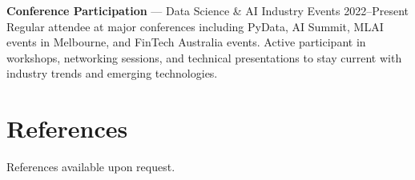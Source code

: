 \documentclass[10pt,letterpaper]{article}
\begin{document}
\textbf{Conference Participation} — Data Science \& AI Industry Events \hfill 2022--Present\\
Regular attendee at major conferences including PyData, AI Summit, MLAI events in Melbourne, and FinTech Australia events. Active participant in workshops, networking sessions, and technical presentations to stay current with industry trends and emerging technologies.

\section*{References}

References available upon request.
\end{document}
